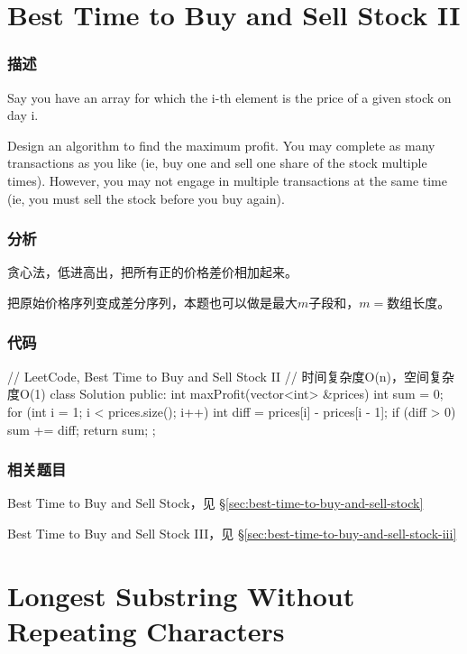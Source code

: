 \section{Best Time to Buy and Sell Stock II} %
\label{sec:best-time-to-buy-and-sell-stock-ii}


\subsubsection{描述}
Say you have an array for which the i-th element is the price of a given stock on day i.

Design an algorithm to find the maximum profit. You may complete as many transactions as you like (ie, buy one and sell one share of the stock multiple times). However, you may not engage in multiple transactions at the same time (ie, you must sell the stock before you buy again).


\subsubsection{分析}
贪心法，低进高出，把所有正的价格差价相加起来。

把原始价格序列变成差分序列，本题也可以做是最大$m$子段和，$m=$数组长度。

\subsubsection{代码}
\begin{Code}
// LeetCode, Best Time to Buy and Sell Stock II
// 时间复杂度O(n)，空间复杂度O(1)
class Solution {
public:
    int maxProfit(vector<int> &prices) {
        int sum = 0;
        for (int i = 1; i < prices.size(); i++) {
            int diff = prices[i] - prices[i - 1];
            if (diff > 0) sum += diff;
        }
        return sum;
    }
};
\end{Code}


\subsubsection{相关题目}
\begindot
\item Best Time to Buy and Sell Stock，见 \S \ref{sec:best-time-to-buy-and-sell-stock}
\item Best Time to Buy and Sell Stock III，见 \S \ref{sec:best-time-to-buy-and-sell-stock-iii}
\myenddot


\section{Longest Substring Without Repeating Characters} %
\label{sec:longest-substring-without-repeating-characters}


